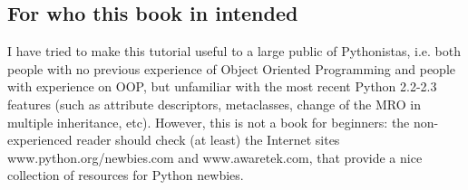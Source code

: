 \documentclass[10pt,english]{article}
\begin{document}

\hypertarget{for-who-this-book-in-intended}{}
\subsection*{For who this book in intended}

I have tried to make this tutorial useful to a large public of Pythonistas, 
i.e. both people with no previous experience of Object Oriented Programming
and people with experience on OOP, but unfamiliar with the most
recent Python 2.2-2.3 features (such as attribute descriptors,
metaclasses, change of the MRO in multiple inheritance, etc). 
However, this is not a book for beginners: the non-experienced reader should 
check (at least) the Internet sites www.python.org/newbies.com and 
www.awaretek.com, that provide a nice collection of resources for Python 
newbies.
\end{document}
